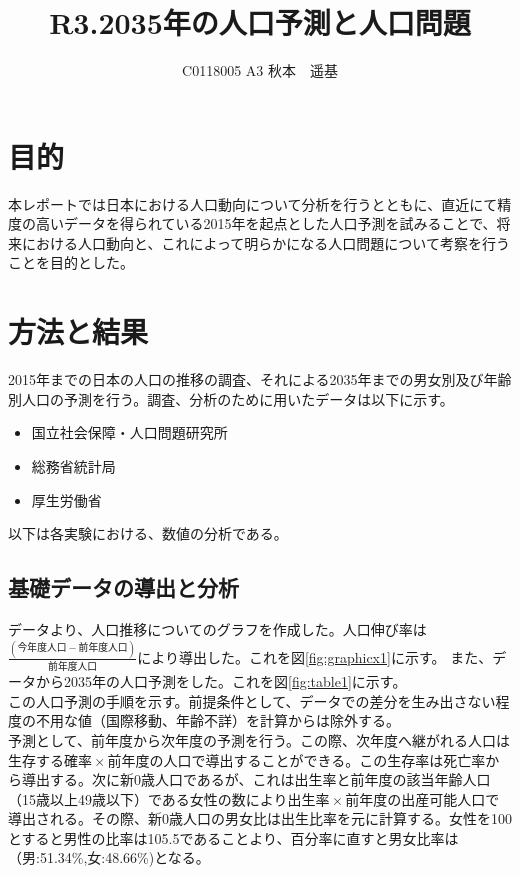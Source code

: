 \documentclass[uplatex, titlepage]{jsarticle}
\title{R3.2035年の人口予測と人口問題}
\author{C0118005 A3 秋本　遥基}
\date{}
\begin{document}
\maketitle

\section{目的}

   本レポートでは日本における人口動向について分析を行うとともに、直近にて精度の高いデータを得られている2015年を起点とした人口予測を試みることで、将来における人口動向と、これによって明らかになる人口問題について考察を行うことを目的とした。

\section{方法と結果}

  2015年までの日本の人口の推移の調査、それによる2035年までの男女別及び年齢別人口の予測を行う。調査、分析のために用いたデータは以下に示す。

\begin{itemize}
  \item 国立社会保障・人口問題研究所\cite{source1}
  \item 総務省統計局\cite{source2}
  \item 厚生労働省 \cite{source3}
\end{itemize}

以下は各実験における、数値の分析である。

\subsection{基礎データの導出と分析}

   データより、人口推移についてのグラフを作成した。人口伸び率は$\frac{(今年度人口-前年度人口)}{前年度人口}$により導出した。これを図\ref{fig:graphicx1}に示す。
   また、データから2035年の人口予測をした。これを図\ref{fig:table1}に示す。\\
   この人口予測の手順を示す。前提条件として、データでの差分を生み出さない程度の不用な値（国際移動、年齢不詳）を計算からは除外する。\\
   予測として、前年度から次年度の予測を行う。この際、次年度へ継がれる人口は$生存する確率 \times 前年度の人口$で導出することができる。この生存率は死亡率\cite{source1}から導出する。次に新0歳人口であるが、これは出生率\cite{source1}と前年度の該当年齢人口（15歳以上49歳以下）である女性の数により$出生率　\times 前年度の出産可能人口$で導出される。その際、新0歳人口の男女比は出生比率を元に計算する。女性を100とすると男性の比率は105.5であることより、百分率に直すと男女比率は（男:51.34\%,女:48.66\%)となる。
\end{document}
